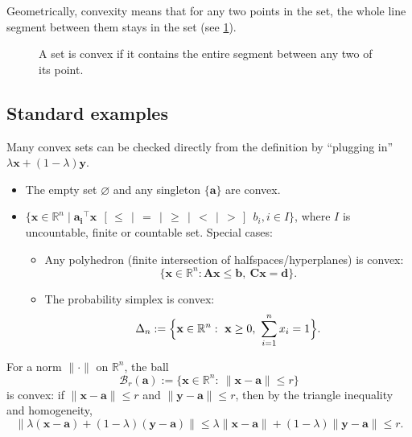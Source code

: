 Geometrically, convexity means that for any two points in the set, the whole
line segment between them stays in the set (see \cref{fig:convex-and-nonconvex}).
\begin{figure}[ht]
    \centering
    \caption{A set is convex if it contains the entire segment between any two
  of its point.}
    \label{fig:convex-and-nonconvex}
\end{figure}

\subsection{Standard examples}
\label{sec:ch4-examples-convex-sets}
Many convex sets can be checked directly from the definition by ``plugging in''
$\lambda \mathbf{x}+(1-\lambda)\mathbf{y}$.

\begin{example}
\leavevmode
\begin{itemize}
  \item The empty set $\varnothing$ and any singleton $\{\mathbf{a}\}$ are convex.
  \item $\{\mathbf{x} \in \mathbb{R}^n \mid \mathbf{a_i}^{\top} \mathbf{x}\ \ 
  [\,\le\, \mid\, =\, \mid\, \ge\, \mid\, <\, \mid\, >\,]\ \  b_i, i \in I\}$, where 
  $I$ is uncountable, finite or countable set.
  Special cases:
  \begin{itemize}
    \item Any polyhedron (finite intersection of halfspaces/hyperplanes) is convex:
  \[
    \{\mathbf{x}\in\mathbb{R}^n:\mathbf{A}\mathbf{x}\le \mathbf{b},\ \mathbf{C}\mathbf{x}=\mathbf{d}\}.
  \]
  \item The probability simplex is convex:
  \[
    \Delta_n:=\Bigl\{\mathbf{x}\in\mathbb{R}^n:\ \mathbf{x}\ge 0,\ \sum_{i=1}^n x_i=1\Bigr\}.
  \]
  \end{itemize}
  
\end{itemize}
\end{example}

\begin{example}[Balls]
For a norm $\|\cdot\|$ on $\mathbb{R}^n$, the ball
\[
  \mathcal{B}_r(\mathbf{a}):=\{\mathbf{x}\in\mathbb{R}^n:\ \|\mathbf{x}-\mathbf{a}\|\le r\}
\]
is convex: if $\|\mathbf{x}-\mathbf{a}\|\le r$ and $\|\mathbf{y}-\mathbf{a}\|\le r$, then by the
triangle inequality and homogeneity,
\[
  \|\lambda(\mathbf{x}-\mathbf{a})+(1-\lambda)(\mathbf{y}-\mathbf{a})\|
  \le \lambda\|\mathbf{x}-\mathbf{a}\|+(1-\lambda)\|\mathbf{y}-\mathbf{a}\|\le r.
\]
\end{example}


